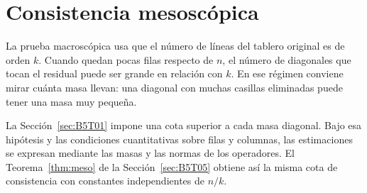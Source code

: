 \section{Consistencia mesoscópica}\label{sec:meso}

La prueba macroscópica usa que el número de líneas del tablero original es de orden $k$.
Cuando quedan pocas filas respecto de $n$, el número de diagonales que tocan el residual
puede ser grande en relación con $k$. En ese régimen conviene mirar cuánta masa llevan:
una diagonal con muchas casillas eliminadas puede tener una masa muy pequeña.

La Sección~\ref{sec:B5T01} impone una cota superior a cada masa diagonal. Bajo esa hipótesis
y las condiciones cuantitativas sobre filas y columnas, las estimaciones se expresan mediante
las masas y las normas de los operadores. El Teorema~\ref{thm:meso} de la
Sección~\ref{sec:B5T05} obtiene así la misma cota de consistencia con constantes
independientes de $n/k$.
